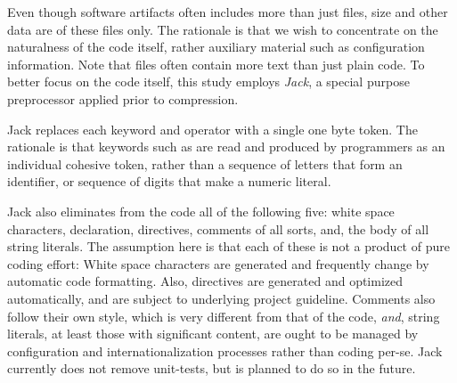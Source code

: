 Even though software artifacts often includes more than just  files,
size and other data are of these files only. The rationale is that we wish to
concentrate on the naturalness of the \Java code itself, rather auxiliary
material such as configuration information. 
Note that  files often contain more text than just plain code.  To
better focus on the code itself, this study employs \emph{Jack}, a special
purpose \Java preprocessor applied prior to compression.

Jack replaces each keyword and operator with a single one byte token. The
rationale is that keywords such as  are read and produced by
programmers as an individual cohesive token, rather than a sequence of letters
that form an identifier, or sequence of digits that make a numeric literal.

Jack also eliminates from the \Java code all of the following five: white space
characters,  declaration,  directives, comments of all
sorts, and, the body of all string literals. The assumption here is that each
of these is not a product of pure coding effort: White space characters are
generated and frequently change by automatic code formatting. Also, 
directives are generated and optimized automatically, and are subject to
underlying project guideline. Comments also follow their own style, which is
very different from that of the code, \emph{and}, string literals, at least
those with significant content, are ought to be managed by configuration and
internationalization processes rather than coding per-se.
Jack currently does not remove unit-tests, but is planned to do so in the
future.

